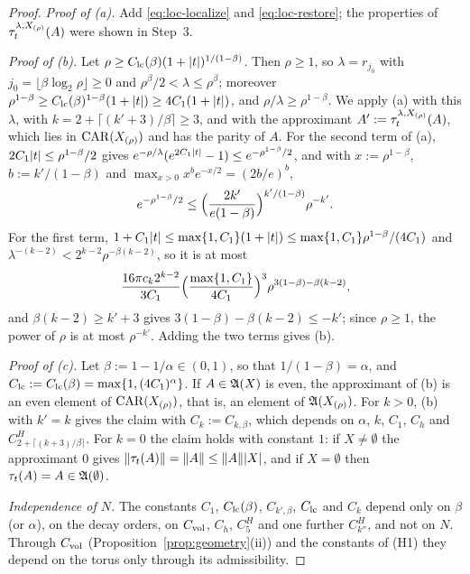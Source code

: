 \begin{proof}
\emph{Proof of (a).} Add \eqref{eq:loc-localize} and \eqref{eq:loc-restore}; the properties of
$\tau^{\lambda,X_{(\rho)}}_t(A)$ were shown in Step~3.

\emph{Proof of (b).} Let $\rho\ge C_{\rm lc}(\beta)(1+\lvert t\rvert)^{1/(1-\beta)}$. Then $\rho\ge1$, so $\lambda=r_{j_0}$ with
$j_0=\lfloor\beta\log_2\rho\rfloor\ge0$ and $\rho^\beta/2<\lambda\le\rho^\beta$; moreover
$\rho^{1-\beta}\ge C_{\rm lc}(\beta)^{1-\beta}(1+\lvert t\rvert)\ge4C_1(1+\lvert t\rvert)$, and $\rho/\lambda\ge\rho^{1-\beta}$. We apply (a) with
this $\lambda$, with $k=2+\lceil(k'+3)/\beta\rceil\ge3$, and with the approximant $A':=\tau^{\lambda,X_{(\rho)}}_t(A)$,
which lies in $\mathrm{CAR}(X_{(\rho)})$ and has the parity of $A$. For the second term of (a), $2C_1\lvert t\rvert\le\rho^{1-\beta}/2$
gives $e^{-\rho/\lambda}(e^{2C_1\lvert t\rvert}-1)\le e^{-\rho^{1-\beta}/2}$, and with $x:=\rho^{1-\beta}$, $b:=k'/(1-\beta)$ and
$\max_{x>0}x^be^{-x/2}=(2b/e)^b$,
\[
e^{-\rho^{1-\beta}/2}\le\Bigl(\frac{2k'}{e(1-\beta)}\Bigr)^{k'/(1-\beta)}\rho^{-k'} .
\]
For the first term, $1+C_1\lvert t\rvert\le\max\{1,C_1\}(1+\lvert t\rvert)\le\max\{1,C_1\}\rho^{1-\beta}/(4C_1)$ and
$\lambda^{-(k-2)}<2^{k-2}\rho^{-\beta(k-2)}$, so it is at most
\[
\frac{16\pi c_k2^{k-2}}{3C_1}\Bigl(\frac{\max\{1,C_1\}}{4C_1}\Bigr)^3\rho^{3(1-\beta)-\beta(k-2)},
\]
and $\beta(k-2)\ge k'+3$ gives $3(1-\beta)-\beta(k-2)\le-k'$; since $\rho\ge1$, the power of $\rho$ is at most
$\rho^{-k'}$. Adding the two terms gives (b).

\emph{Proof of (c).} Let $\beta:=1-1/\alpha\in(0,1)$, so that $1/(1-\beta)=\alpha$, and $C_{\rm lc}:=C_{\rm lc}(\beta)=\max\{1,(4C_1)^\alpha\}$.
If $A\in\mathfrak{A}(X)$ is even, the approximant of (b) is an even element of $\mathrm{CAR}(X_{(\rho)})$, that is, an element of
$\mathfrak{A}(X_{(\rho)})$. For $k>0$, (b) with $k'=k$ gives the claim with $C_k:=C_{k,\beta}$, which depends on $\alpha$,
$k$, $C_1$, $C_h$ and $C^H_{2+\lceil(k+3)/\beta\rceil}$. For $k=0$ the claim holds with constant $1$: if $X\ne\emptyset$
the approximant $0$ gives $\lVert\tau_t(A)\rVert=\lVert A\rVert\le\lVert A\rVert\lvert X\rvert$, and if $X=\emptyset$ then $\tau_t(A)=A\in\mathfrak{A}(\emptyset)$.

\emph{Independence of $N$.} The constants $C_1$, $C_{\rm lc}(\beta)$, $C_{k',\beta}$, $C_{\rm lc}$ and $C_k$ depend only on $\beta$ (or
$\alpha$), on the decay orders, on $C_{\mathrm{vol}}$, $C_h$, $C^H_5$ and one further $C^H_{k''}$, and not on $N$. Through $C_{\mathrm{vol}}$
(Proposition~\ref{prop:geometry}(ii)) and the constants of (H1) they depend on the torus only through its
admissibility.
\end{proof}

